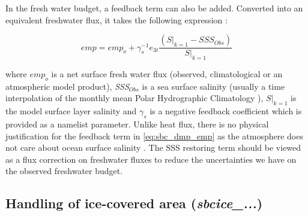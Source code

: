 \documentclass[../main/NEMO_manual]{subfiles}
\begin{document}
In the fresh water budget, a feedback term can also be added.
Converted into an equivalent freshwater flux, it takes the following expression :

\begin{equation}
  \label{eq:sbc_dmp_emp}
  \textit{emp} = \textit{emp}_o + \gamma_s^{-1} e_{3t}  \frac{  \left(\left.S\right|_{k=1}-SSS_{Obs}\right)}
  {\left.S\right|_{k=1}}
\end{equation}

where $\textit{emp}_{o }$ is a net surface fresh water flux
(observed, climatological or an atmospheric model product),
\textit{SSS}$_{Obs}$ is a sea surface salinity
(usually a time interpolation of the monthly mean Polar Hydrographic Climatology \citep{Steele2001}),
$\left.S\right|_{k=1}$ is the model surface layer salinity and
$\gamma_s$ is a negative feedback coefficient which is provided as a namelist parameter.
Unlike heat flux, there is no physical justification for the feedback term in \autoref{eq:sbc_dmp_emp} as
the atmosphere does not care about ocean surface salinity \citep{Madec1997}.
The SSS restoring term should be viewed as a flux correction on freshwater fluxes to
reduce the uncertainties we have on the observed freshwater budget.

\subsection{Handling of ice-covered area  (\textit{sbcice\_...})}
\label{subsec:SBC_ice-cover}
\end{document}
